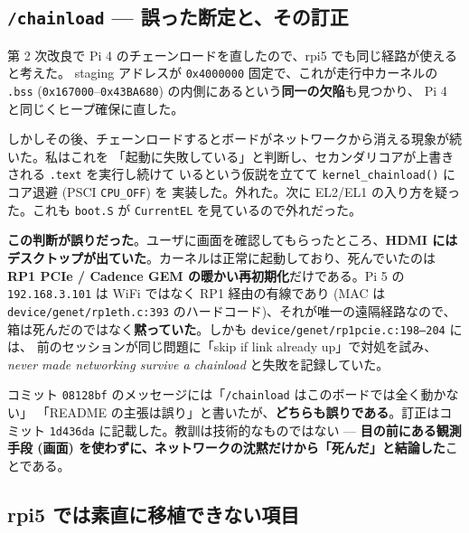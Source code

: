 \documentclass[a4paper,11pt]{ltjsarticle}
\begin{document}
\subsection{\texttt{/chainload} --- 誤った断定と、その訂正}

第 2 次改良で Pi 4 のチェーンロードを直したので、rpi5 でも同じ経路が使えると考えた。
staging アドレスが \texttt{0x4000000} 固定で、これが走行中カーネルの \texttt{.bss}
(\texttt{0x167000}--\texttt{0x43BA680}) の内側にあるという\textbf{同一の欠陥}も見つかり、
Pi 4 と同じくヒープ確保に直した。

しかしその後、チェーンロードするとボードがネットワークから消える現象が続いた。私はこれを
「起動に失敗している」と判断し、セカンダリコアが上書きされる \texttt{.text} を実行し続けて
いるという仮説を立てて \texttt{kernel\_chainload()} にコア退避 (PSCI \texttt{CPU\_OFF}) を
実装した。外れた。次に EL2/EL1 の入り方を疑った。これも \texttt{boot.S} が
\texttt{CurrentEL} を見ているので外れだった。

\textbf{この判断が誤りだった}。ユーザに画面を確認してもらったところ、\textbf{HDMI には
デスクトップが出ていた}。カーネルは正常に起動しており、死んでいたのは
\textbf{RP1 PCIe / Cadence GEM の暖かい再初期化}だけである。Pi 5 の
\texttt{192.168.3.101} は WiFi ではなく RP1 経由の有線であり
(MAC は \texttt{device/genet/rp1eth.c:393} のハードコード)、それが唯一の遠隔経路なので、
箱は死んだのではなく\textbf{黙っていた}。しかも \texttt{device/genet/rp1pcie.c:198--204} には、
前のセッションが同じ問題に「skip if link already up」で対処を試み、
\textit{never made networking survive a chainload} と失敗を記録していた。

コミット \texttt{08128bf} のメッセージには「\texttt{/chainload} はこのボードでは全く動かない」
「README の主張は誤り」と書いたが、\textbf{どちらも誤りである}。訂正はコミット
\texttt{1d436da} に記載した。教訓は技術的なものではない --- \textbf{目の前にある観測手段
(画面) を使わずに、ネットワークの沈黙だけから「死んだ」と結論した}ことである。

\subsection{rpi5 では素直に移植できない項目}
\end{document}
